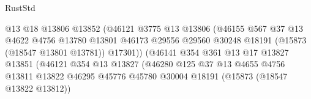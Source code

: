 \begin{lexlean}{RustStd}
\begin{coremodule}
                                            @13
                                            @18
                                            @13806
                                            @13852
                                            (@46121
                                              @3775
                                              @13
                                              @13806
                                              (@46155
                                                @567
                                                @37
                                                @13
                                                @4622
                                                @4756
                                                @13780
                                                @13801
                                                @46173
                                                @29556
                                                @29560
                                                @30248
                                                @18191
                                                (@15873 (@18547 @13801 @13781))
                                                @17301))
                                            (@46141
                                              @354
                                              @361
                                              @13
                                              @17
                                              @13827
                                              @13851
                                              (@46121
                                                @354
                                                @13
                                                @13827
                                                (@46280
                                                  @125
                                                  @37
                                                  @13
                                                  @4655
                                                  @4756
                                                  @13811
                                                  @13822
                                                  @46295
                                                  @45776
                                                  @45780
                                                  @30004
                                                  @18191
                                                  (@15873 (@18547 @13822 @13812))

\end{coremodule}
\end{lexlean}
